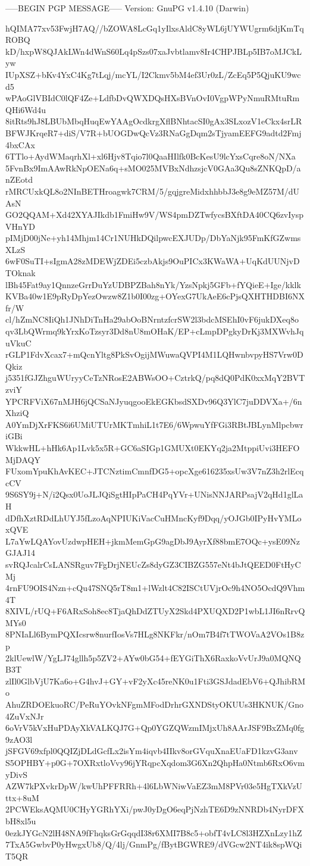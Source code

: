 -----BEGIN PGP MESSAGE-----
Version: GnuPG v1.4.10 (Darwin)

hQIMA77xv53FwjH7AQ//bZOWA8LcGq1yIlxsAldC8yWL6jUYWUgrm6djKmTqROBQ
kD/hxpW8QJAkLWn4dWnS60Lq4pSzs07xaJvbtlamv8Ir4CHPJBLp5IB7oMJCkLyw
IUpXSZ+bKv4YxC4Kg7tLqj/mcYL/I2Ckmv5bM4ef3Ur0zL/ZcEq5P5QjuKU9wcd5
wPAoGlVBIdC0lQF4Ze+LdfbDvQWXDQsHXsBVnOvI0VgpWPyNmuRMtuRmQHi6Wd4u
8itRts9hJ8LBUbMbqHuqEwYAAgOcdkrgXflBNhtacSI0gAx3SLxozV1eCkx4srLR
BFWJKrqeR7+diS/V7R+bUOGDwQcVz3RNaGgDqm2sTjyamEEFG9adtd2Fmj4bxCAx
6TTlo+AydWMaqrhXl+xl6Hjv8Tqio7l0QaaHIlfk0BcKesU9lcYxsCqre8oN/NXa
5FvnBx9ImAAwRkNpOENa6q+sMO025MVBxNdhzsjcV0GAa3Qu8sZNKQpD/anZEotd
rMRCUxkQL8o2NInBETHroagwk7CRM/5/gqjgreMidxhhbbJ3e8g9eMZ57M/dUAsN
GO2QQAM+Xd42XYAJIkdb1FmiHw9V/WS4pmDZTwfycsBXftDA40CQ6zvIyspVHnYD
pIMjD00jNe+yh14Mhjm14Cr1NUHkDQilpwcEXJUDp/DbYaNjk95FmKfGZwmsXLzS
6wF0SuTI+sIgmA28zMDEWjZDEi5czbAkjs9OuPICx3KWaWA+UqKdUUNjvDTOknak
lBh45Fat9ay1QnnzeGrrDuYzUDBPZBah8nYk/YzsNpkj5GFb+fYQieE+Ige/kklk
KVBa40w1E9pRyDpYezOwzw8Z1b0I00zg+OYexG7UkAeE6cPjsQXHTHDBI6NXfr/W
cl/hZmNC8IiQh1JNhDiTnHa29abOoBNrntzfcrSW2l3bdcMSEhI0vF6jukDXeq8o
qv3LbQWrmq9kYrxKoTzsyr3Dd8nU8mOHaK/EP+cLmpDPgkyDrKj3MXWvhJquVkuC
rGLP1FdvXcax7+mQcnYltg8PkSvOgijMWuwaQVPI4M1LQHwnbvpyHS7Vrw0DQkiz
j5351fGJZhguWUryyCeTzNRosE2ABWsOO+CztrkQ/pq8dQ0PdK0xxMqY2BVTzviY
YPCRFViX67nMJH6jQCSaNJyuqgooEkEGKbsdSXDv96Q3YlC7juDDVXa+/6nXhziQ
A0YmDjXrFKS6i6UMiUTUrMKTmhiL1t7E6/6WpwuYfFGi3RBtJBLynMlpcbwriGBi
WkkwHL+hHk6Ap1Lvk5x5R+GC6aSIGp1GMUXt0EKYq2ja2MtppiUvi3HEFOMjDAQY
FUxomYpuKhAvKEC+JTCNztimCmnfDG5+opcXge616235xsUw3V7nZ3h2rlEcqcCV
9S6SY9j+N/i2Qsx0UoJLJQiSgtHIpPaCH4PqYVr+UNisNNJARPsajV2qHd1glLaH
dDfhXztRDdLhUYJ5fLzoAqNPIUKiVacCuHMncKyf9Dqq/yOJGb0IPyHvYMLoxQVE
L7aYwLQAYovUzdwpHEH+jkmMemGpG9agDbJ9AyrXf88bmE7OQc+ysE09NzGJAJ14
svRQJcalrCsLANSRguv7FgDrjNEUcZs8dyGZ3CIBZG557eNt4bJtQEED0FtHyCMj
4rnFU9OIS4Nzn+cQu47SNQ5rT8m1+lWzlt4C82ISCtUVjrOc9h4NO5OcdQ9Vhm4T
8XIVL/rUQ+F6ARxSoh8ec8TjaQhDdZTUyX2Skd4PXUQXD2P1wbL1JI6nRrvQMYs0
8PNIaLl6BymPQXIcsrw8nurfIosVs7HLg8NKFkr/nOm7B4f7tTWOVaA2VOs1B8zp
2klUewlW/YgLJ74gllh5p5ZV2+AYw0bG54+fEYGiThX6RaxkoVvUrJ9a0MQNQB3T
zlIl0GlbVjU7Ka6o+G4hvJ+GY+vF2yXc45reNK0u1Fti3GSJdadEbV6+QJhibRMo
AhuZRDOEkuoRC/PeRuYOvkNFgmMFodDrhrGXNDStyOKUUs3HKNUK/Gno4ZuVxNJr
6oVrV5kVxHuPDAyXkVALKQJ7G+Qp0YGZQWzmIMjxUh8AArJSF9BxZMq0fg9zAO3l
jSFGV69xfpl0QQIZjDLdGcfLx2isYm4iqvb4IIkv8orGVquXnaEUaFD1kzvG3anv
S5OPHBY+p0G+7OXRxtloVvy96jYRqpcXqdom3G6Xn2QhpHa0Ntmb6RxO6vmyDivS
AZW7kPXvkrDpW/kwUhPFFRRh+4l6LbWNiwVaEZ3mM8PVr03e5HgTXkVzUttx+8uM
2PCWEksAQMU0CHyYGRhYXi/pwJ0yDgO6eqPjNzhTE6D9zNNRDb4NyrDFXbH8xl5u
0ezkJYGcN2lH48NA9fFhqksGrGqqdI38r6XMI7B8c5+obfT4vLC8l3HZXnLzy1hZ
7TxA5GwbvP0yHwgxUb8/Q/4lj/GnmPg/fBytBGWRE9/dVGcw2NT4ik8spWQiT5QR

